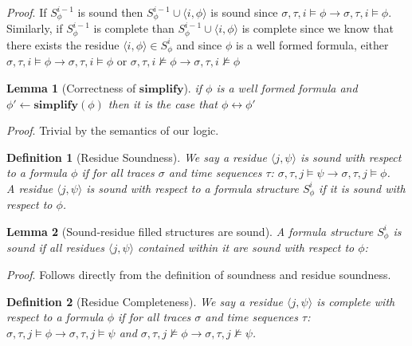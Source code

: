 \documentclass[10pt,a4paper]{article}
\newcommand{\rp}[2]{\ensuremath{\langle #1, #2 \rangle}}
\newtheorem{tdef}{Definition}
\newtheorem{lemma}{Lemma}
\begin{document}
\noindent \emph{Proof}. If $S^{i-1}_{\phi}$ is sound then $S^{i-1}_{\phi} \cup \rp{i}{\phi}$ is sound since $\sigma, \tau, i \vDash \phi \rightarrow \sigma, \tau, i \vDash \phi$. Similarly, if $S^{i-1}_{\phi}$ is complete than $S^{i-1}_{\phi} \cup \rp{i}{\phi}$ is complete since we know that there exists the residue $\rp{i}{\phi} \in {S}^{i}_{\phi}$ and since $\phi$ is a well formed formula, either $\sigma, \tau, i \vDash \phi \rightarrow \sigma, \tau, i \vDash \phi$ or $\sigma, \tau, i \nvDash \phi \rightarrow \sigma, \tau, i \nvDash \phi$

\begin{lemma}[Correctness of $\mathbf{simplify}$]
if $\phi$ is a well formed formula and $\phi' \leftarrow \mathbf{simplify}(\phi)$ then it is the case that $\phi \leftrightarrow \phi'$
\end{lemma}

\noindent \emph{Proof}. Trivial by the semantics of our logic. \\

\begin{tdef}[Residue Soundness]
We say a residue $\rp{j}{\psi}$ is sound with respect to a formula $\phi$ if for all traces $\sigma$ and time sequences $\tau$: $\sigma, \tau, j \vDash \psi \rightarrow \sigma, \tau, j \vDash \phi$. \\

\noindent A residue $\rp{j}{\psi}$ is sound with respect to a formula structure $S^i_{\phi}$ if it is sound with respect to $\phi$.
\end{tdef}

\begin{lemma}[Sound-residue filled structures are sound]
A formula structure $S^i_{\phi}$ is sound if all residues $\rp{j}{\psi}$ contained within it are sound with respect to $\phi$:
\end{lemma}

\noindent \emph{Proof}. Follows directly from the definition of soundness and residue soundness. \\


\begin{tdef}[Residue Completeness]
We say a residue $\rp{j}{\psi}$ is complete with respect to a formula $\phi$ if for all traces $\sigma$ and time sequences $\tau$: $\sigma,\tau, j \vDash \phi \rightarrow \sigma,\tau,j \vDash \psi$ and $\sigma,\tau,j \nvDash \phi \rightarrow \sigma, \tau, j \nvDash \psi$.
\end{tdef}
\end{document}
